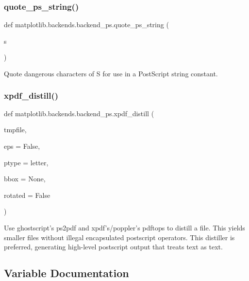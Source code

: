 \subsubsection{\texorpdfstring{quote\+\_\+ps\+\_\+string()}{quote\_ps\_string()}}
{\footnotesize\ttfamily def matplotlib.\+backends.\+backend\+\_\+ps.\+quote\+\_\+ps\+\_\+string (\begin{DoxyParamCaption}\item[{}]{s }\end{DoxyParamCaption})}

\begin{DoxyVerb}Quote dangerous characters of S for use in a PostScript string constant.
\end{DoxyVerb}
 \mbox{\label{namespacematplotlib_1_1backends_1_1backend__ps_a8b81a9d051e4d7fcd45aa47e3194b555}} 
\subsubsection{\texorpdfstring{xpdf\+\_\+distill()}{xpdf\_distill()}}
{\footnotesize\ttfamily def matplotlib.\+backends.\+backend\+\_\+ps.\+xpdf\+\_\+distill (\begin{DoxyParamCaption}\item[{}]{tmpfile,  }\item[{}]{eps = {\ttfamily False},  }\item[{}]{ptype = {\ttfamily \textquotesingle{}letter\textquotesingle{}},  }\item[{}]{bbox = {\ttfamily None},  }\item[{}]{rotated = {\ttfamily False} }\end{DoxyParamCaption})}

\begin{DoxyVerb}Use ghostscript's ps2pdf and xpdf's/poppler's pdftops to distill a file.
This yields smaller files without illegal encapsulated postscript
operators. This distiller is preferred, generating high-level postscript
output that treats text as text.
\end{DoxyVerb}
 

\subsection{Variable Documentation}
\mbox{\label{namespacematplotlib_1_1backends_1_1backend__ps_aa2a26be019f2a6fafae780106d6d952a}} 
